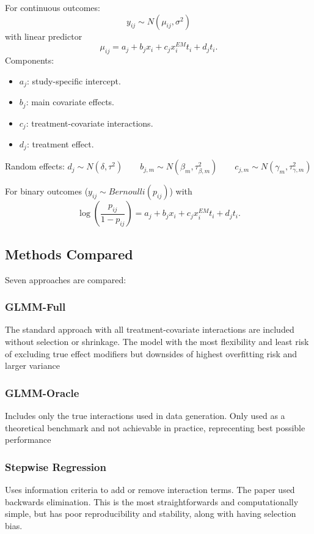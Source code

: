 \documentclass[11pt]{article}
\begin{document}
For continuous outcomes:\[y_{ij}\sim N(\mu_{ij}, \sigma^2)\] with linear predictor\[\mu_{ij}=a_j+b_j x_i+c_j x_i^{EM} t_i+d_j t_i.\]
Components:
\begin{itemize}
    \item $a_j$: study-specific intercept.
    \item $b_j$: main covariate effects.
    \item $c_j$: treatment-covariate interactions.
    \item $d_j$: treatment effect.
\end{itemize}
Random effects: $d_j\sim N(\delta,\tau^2) \qquad b_{j,m}\sim N(\beta_m,\tau_{\beta,m}^2) \qquad c_{j,m}\sim N(\gamma_m,\tau_{\gamma,m}^2)$

For binary outcomes ($y_{ij}\sim Bernoulli(p_{ij})$) with\[\log\left(\frac{p_{ij}}{1-p_{ij}}\right)=a_j+b_j x_i+c_j x_i^{EM} t_i+d_j t_i.\]

\subsection*{Methods Compared}

Seven approaches are compared:

\subsubsection*{GLMM-Full}

The standard approach with all treatment-covariate interactions are included without selection or shrinkage. The model with the most flexibility and least risk of excluding true effect modifiers but downsides of highest overfitting risk and larger variance

\subsubsection*{GLMM-Oracle}

Includes only the true interactions used in data generation. Only used as a theoretical benchmark and not achievable in practice, reprecenting best possible performance

\subsubsection*{Stepwise Regression}

Uses information criteria to add or remove interaction terms. The paper used backwards elimination. This is the most straightforwards and computationally simple, but has poor reproducibility and stability, along with having selection bias.
\end{document}
